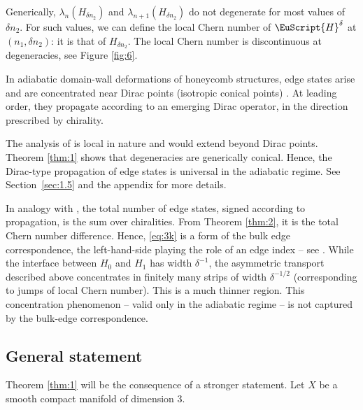 \documentclass[JEP,XML,SOM,Unicode,NoFloatCountersInSection]{cedram}
\let\pazocal\EuScript
\theoremstyle{definition}
\newcommand{\HH}{\pazocal{H}}
\begin{document}
Generically, $\lambda_n(H_{\delta n_2})$ and $\lambda_{n+1}(H_{\delta n_2})$ do not degenerate for most values of $\delta n_2$. For such values, we can define the local Chern number of $\HH^\delta$ at $(n_1,\delta n_2)$: it is that of $H_{\delta n_2}$. The local Chern number is discontinuous at degeneracies, see Figure \ref{fig:6}.

In adiabatic domain-wall deformations of honeycomb structures, edge states arise and are concentrated near Dirac points (isotropic conical points) \cite{FLW16,LWZ17,D19a,DW19}. At leading order, they propagate according to an emerging Dirac operator, in the direction prescribed by chirality.

The analysis of \cite{FLW16,LWZ17,D19a,DW19} is local in nature and would extend beyond Dirac points. Theorem \ref{thm:1} shows that degeneracies are generically conical. Hence, the Dirac-type propagation of edge states is universal in the adiabatic regime. See Section~\ref{sec:1.5} and the appendix for more details.

In analogy with \cite{D19a,D19b,DW19}, the total number of edge states, signed according to propagation, is the sum over chiralities. From Theorem \ref{thm:2}, it is the total Chern number difference. Hence, \eqref{eq:3k} is a form of the bulk edge correspondence, the left-hand-side playing the role of an edge index -- see \cite{H93,KRS02,EGS05,ASV13,GP13,PS16,BKR17,D19c}. While the interface between $H_0$ and $H_1$ has width $\delta^{-1}$, the asymmetric transport described above concentrates in finitely many strips of width $\delta^{-1/2}$ (corresponding to jumps of local Chern number). This is a much thinner region. This concentration phenomenon -- valid only in the adiabatic regime -- is not captured by the bulk-edge correspondence.

\subsection{General statement}\label{sec:1.4} Theorem \ref{thm:1} will be the consequence of a stronger statement. Let $X$ be a smooth compact manifold of dimension 3.
\end{document}
